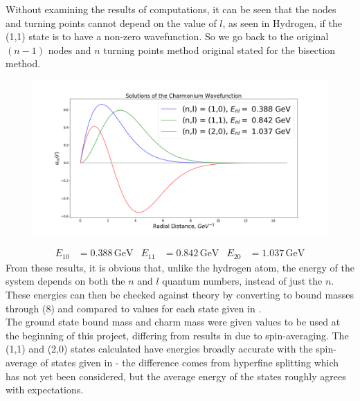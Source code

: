 \documentclass[landscape,a2paper,fontscale=0.65]{baposter}
\begin{document}
\begin{poster}
{    Without examining the results of computations, it can be seen that the nodes and turning points cannot depend on the value of $l$, as seen in Hydrogen, if the (1,1) state is to have a non-zero wavefunction. 
    So we go back to the original $(n-1)$ nodes and $n$ turning points method original stated for the bisection method.
    \begin{figure}[H]
        \centering
        \includegraphics[width=\linewidth]{Charmonium}
    \end{figure}
    \vspace{-15pt}
    \begin{align}
        E_{10} &= 0.388\,\text{GeV} & E_{11} &= 0.842\,\text{GeV} & E_{20} &= 1.037\,\text{GeV}
    \end{align}
    From these results, it is obvious that, unlike the hydrogen atom, the energy of the system depends on both the $n$ and $l$ quantum numbers, instead of just the $n$.\\
    These energies can then be checked against theory by converting to bound masses through (8) and compared to values for each state given in \cite{website:pdg}. \\
    The ground state bound mass and charm mass were given values to be used at the beginning of this project, differing from results in \cite{website:pdg} due to spin-averaging.
    The (1,1) and (2,0) states calculated have energies broadly accurate with the spin-average of states given in \cite{website:pdg} - the difference comes from hyperfine splitting which has not yet been considered, but the average energy of the states roughly agrees with expectations.
}


\end{poster}
\end{document}
